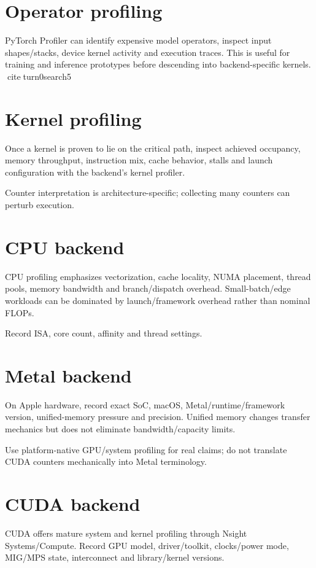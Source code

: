 \section{Operator profiling}
PyTorch Profiler can identify expensive model operators, inspect input shapes/stacks, device kernel activity and execution traces. This is useful for training and inference prototypes before descending into backend-specific kernels. citeturn0search5

\section{Kernel profiling}
Once a kernel is proven to lie on the critical path, inspect achieved occupancy, memory throughput, instruction mix, cache behavior, stalls and launch configuration with the backend's kernel profiler.

Counter interpretation is architecture-specific; collecting many counters can perturb execution.

\section{CPU backend}
CPU profiling emphasizes vectorization, cache locality, NUMA placement, thread pools, memory bandwidth and branch/dispatch overhead. Small-batch/edge workloads can be dominated by launch/framework overhead rather than nominal FLOPs.

Record ISA, core count, affinity and thread settings.

\section{Metal backend}
On Apple hardware, record exact SoC, macOS, Metal/runtime/framework version, unified-memory pressure and precision. Unified memory changes transfer mechanics but does not eliminate bandwidth/capacity limits.

Use platform-native GPU/system profiling for real claims; do not translate CUDA counters mechanically into Metal terminology.

\section{CUDA backend}
CUDA offers mature system and kernel profiling through Nsight Systems/Compute. Record GPU model, driver/toolkit, clocks/power mode, MIG/MPS state, interconnect and library/kernel versions.

